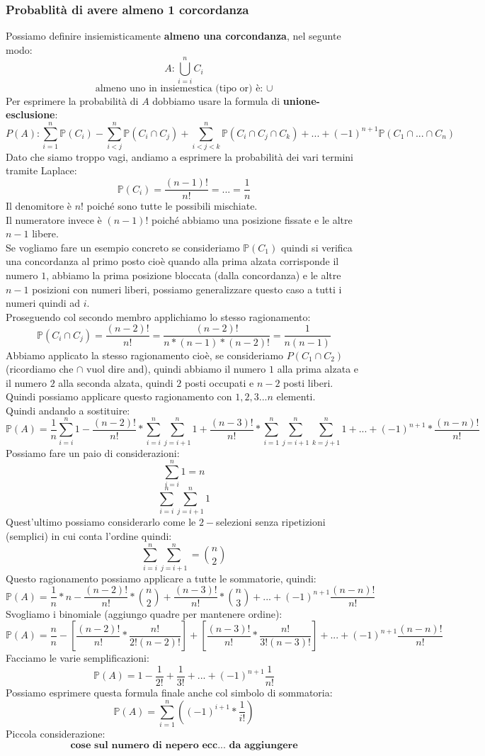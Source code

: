 \subsubsection{Probablità di avere almeno 1 corcordanza}
Possiamo definire insiemisticamente \textbf{almeno una corcondanza}, nel segunte modo: 
$$ A: \bigcup_{i=i}^n C_i$$
$$ \text{almeno uno in insiemestica (tipo or) è: } \cup $$
Per esprimere la probabilità di $A$ dobbiamo usare la formula di \textbf{unione-esclusione}:
$$ P(A): \sum_{i=1}^n \mathbb{P}(C_i) - \sum_{i<j}^n \mathbb{P}(C_i \cap C_j) + \sum_{i<j<k}^n \mathbb{P}(C_i \cap C_j \cap C_k) + ... + (-1)^{n+1} \mathbb{P} (C_1 \cap ... \cap C_n) $$
Dato che siamo troppo vagi, andiamo a esprimere la probabilità dei vari termini tramite Laplace:
$$ \mathbb{P}(C_i) = \frac{(n-1)!}{n!} = ... = \frac{1}{n} $$
Il denomitore è $n!$ poiché sono tutte le possibili mischiate.\\
Il numeratore invece è $(n-1)!$ poiché abbiamo una posizione fissate e le altre $n-1$ libere.\\
Se vogliamo fare un esempio concreto se consideriamo $\mathbb{P}(C_1)$ quindi si verifica una concordanza al primo posto cioè quando alla prima alzata corrisponde il numero $1$, abbiamo la prima posizione bloccata (dalla concordanza) e le altre $n-1$ posizioni con numeri liberi, possiamo generalizzare questo caso a tutti i numeri quindi ad $i$.\\
Proseguendo col secondo membro applichiamo lo stesso ragionamento:
$$ \mathbb{P}(C_i \cap C_j) = \frac{(n-2)!}{n!} = \frac{(n-2)!}{n*(n-1)*(n-2)!} = \frac{1}{n(n-1)}  $$
Abbiamo applicato la stesso ragionamento cioè, se consideriamo $ P(C_1 \cap C_2)$ (ricordiamo che $\cap$ vuol dire and), quindi abbiamo il numero $1$ alla prima alzata e il numero $2$ alla seconda alzata, quindi $2$ posti occupati e $n-2$ posti liberi.\\
Quindi possiamo applicare questo ragionamento con $1,2,3...n$ elementi.\\
Quindi andando a sostituire:
$$ \mathbb{P}(A) = \frac{1}{n} \sum_{i=i}^n 1 - \frac{(n-2)!}{n!} * \sum_{i=i}^n \sum_{j=i+1}^n 1 + \frac{(n-3)!}{n!} * \sum_{i=1}^n \sum_{j=i+1}^n \sum_{k=j+1}^n 1 + ... + (-1)^{n+1} * \frac{(n-n)!}{n!} $$
Possiamo fare un paio di considerazioni:
$$ \sum_{i=i}^n 1 = n $$
$$ \sum_{i=i}^n \sum_{j=i+1}^n 1 $$
Quest'ultimo possiamo considerarlo come le $2-$selezioni senza ripetizioni (semplici) in cui conta l'ordine quindi:
$$ \sum_{i=i}^n \sum_{j=i+1}^n = \binom{n}{2} $$
Questo ragionamento possiamo applicare a tutte le sommatorie, quindi:
$$ \mathbb{P}(A) = \frac{1}{n} * n - \frac{(n-2)!}{n!} * \binom{n}{2} + \frac{(n-3)!}{n!} * \binom{n}{3} + ... + (-1)^{n+1} \frac{(n-n)!}{n!} $$
Svogliamo i binomiale (aggiungo quadre per mantenere ordine):
$$ \mathbb{P}(A) = \frac{n}{n} - [ \frac{(n-2)!}{n!} * \frac{n!}{2!(n-2)!} ] +  [ \frac{(n-3)!}{n!} * \frac{n!}{3! (n-3)!} ] + ... + (-1)^{n+1} \frac{(n-n)!}{n!} $$
Facciamo le varie semplificazioni:
$$ \mathbb{P}(A) = 1 - \frac{1}{2!} + \frac{1}{3!} + ... + (-1)^{n+1} \frac{1}{n!} $$
Possiamo esprimere questa formula finale anche col simbolo di sommatoria:
$$ \mathbb{P}(A) = \sum_{i=1}^n ((-1)^{i+1} * \frac{1}{i!}) $$
Piccola considerazione:
$$ \textbf{cose sul numero di nepero ecc... da aggiungere} $$
